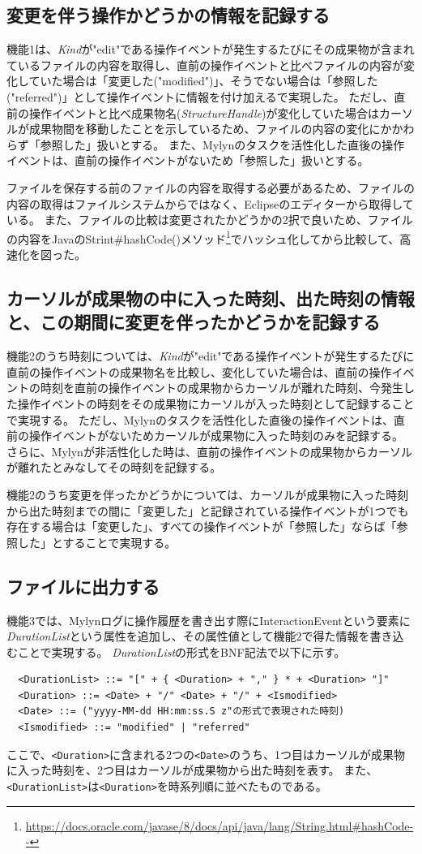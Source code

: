 \documentclass[a4paper]{jsbook}
\begin{document}
\subsection{変更を伴う操作かどうかの情報を記録する}
機能1は、{\it Kind}が"edit"である操作イベントが発生するたびにその成果物が含まれているファイルの内容を取得し、直前の操作イベントと比べファイルの内容が変化していた場合は「変更した("modified")」、そうでない場合は「参照した("referred")」として操作イベントに情報を付け加えるで実現した。
ただし、直前の操作イベントと比べ成果物名({\it StructureHandle})が変化していた場合はカーソルが成果物間を移動したことを示しているため、ファイルの内容の変化にかかわらず「参照した」扱いとする。
また、Mylynのタスクを活性化した直後の操作イベントは、直前の操作イベントがないため「参照した」扱いとする。

ファイルを保存する前のファイルの内容を取得する必要があるため、ファイルの内容の取得はファイルシステムからではなく、Eclipseのエディターから取得している。
また、ファイルの比較は変更されたかどうかの2択で良いため、ファイルの内容をJavaのStrint\#hashCode()メソッド\footnote{\url{https://docs.oracle.com/javase/8/docs/api/java/lang/String.html\#hashCode--}}でハッシュ化してから比較して、高速化を図った。

\subsection{カーソルが成果物の中に入った時刻、出た時刻の情報と、この期間に変更を伴ったかどうかを記録する}
機能2のうち時刻については、{\it Kind}が"edit"である操作イベントが発生するたびに直前の操作イベントの成果物名を比較し、変化していた場合は、直前の操作イベントの時刻を直前の操作イベントの成果物からカーソルが離れた時刻、今発生した操作イベントの時刻をその成果物にカーソルが入った時刻として記録することで実現する。
ただし、Mylynのタスクを活性化した直後の操作イベントは、直前の操作イベントがないためカーソルが成果物に入った時刻のみを記録する。
さらに、Mylynが非活性化した時は、直前の操作イベントの成果物からカーソルが離れたとみなしてその時刻を記録する。

機能2のうち変更を伴ったかどうかについては、カーソルが成果物に入った時刻から出た時刻までの間に「変更した」と記録されている操作イベントが1つでも存在する場合は「変更した」、すべての操作イベントが「参照した」ならば「参照した」とすることで実現する。

\subsection{ファイルに出力する}
機能3では、Mylynログに操作履歴を書き出す際にInteractionEventという要素に{\it DurationList}という属性を追加し、その属性値として機能2で得た情報を書き込むことで実現する。
{\it DurationList}の形式をBNF記法で以下に示す。
\begin{verbatim}
  <DurationList> ::= "[" + { <Duration> + "," } * + <Duration> "]"
  <Duration> ::= <Date> + "/" <Date> + "/" + <Ismodified>
  <Date> ::= ("yyyy-MM-dd HH:mm:ss.S z"の形式で表現された時刻)
  <Ismodified> ::= "modified" | "referred"
\end{verbatim}
ここで、\texttt{<Duration>}に含まれる2つの\texttt{<Date>}のうち、1つ目はカーソルが成果物に入った時刻を、2つ目はカーソルが成果物から出た時刻を表す。
また、\texttt{<DurationList>}は\texttt{<Duration>}を時系列順に並べたものである。
\end{document}
